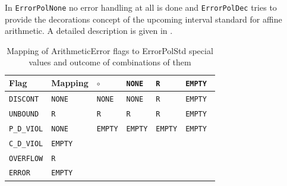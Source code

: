 \documentclass[a4]{scrartcl}
\begin{document}
In \texttt{ErrorPolNone} no error handling at all is done and
\texttt{ErrorPolDec} tries to provide the decorations concept of the upcoming
interval standard \cite{P1788022} for affine arithmetic. A detailed
description is given in \cite{yalaadeko}.
\begin{table}
  \centering
  \begin{tabular}{ll||l|lll}
    \hline
    Flag & Mapping & $\circ$ & \texttt{NONE} & \texttt{R} & \texttt{EMPTY} \\
    \hline
    \texttt{DISCONT} & \texttt{NONE} & \texttt{NONE}&  \texttt{NONE} &
    \texttt{R} & \texttt{EMPTY }\\
    \texttt{UNBOUND} & \texttt{R} & \texttt{R} & \texttt{R} & \texttt{R} & \texttt{EMPTY}\\
    \texttt{P\_D\_VIOL} & \texttt{NONE} & \texttt{EMPTY} & \texttt{EMPTY} &
    \texttt{EMPTY} & \texttt{EMPTY}\\
    \texttt{C\_D\_VIOL} & \texttt{EMPTY} & &\\
    \texttt{OVERFLOW} & \texttt{R} & & \\
    \texttt{ERROR} & \texttt{EMPTY} & &\\
    \hline
  \end{tabular}
  \caption{Mapping of ArithmeticError flags to ErrorPolStd special values and
    outcome of combinations of them}
  \label{tab:errorpolstd_map}
\end{table}

\end{document}
